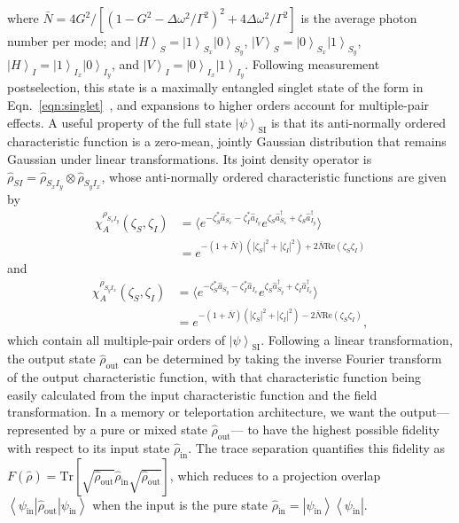 \documentclass[aps,twocolumn,secnumarabic,amsmath,amssymb,pra,groupedaddress,
showpacs, showkeys]{revtex4-1}
\newcommand{\bra}[1]{\left\langle #1 \right|}
\newcommand{\ket}[1]{\left|#1\right\rangle}
\newcommand{\pna}[1]{\left(#1\right)}
\newcommand{\pnb}[1]{\left[#1\right]}
\begin{document}
where $\bar{N}=4G^2/\pnb{\pna{1-G^2-\Delta
    \omega^2/\Gamma^2}^2+4\Delta\omega^2/\Gamma^2}$ is the average photon
number per mode; and $\ket{H}_S=\ket{1}_{S_x}\ket{0}_{S_y}$,
$\ket{V}_S=\ket{0}_{S_x}\ket{1}_{S_y}$, $\ket{H}_I=\ket{1}_{I_x}\ket{0}_{I_y}$,
and $\ket{V}_I=\ket{0}_{I_x}\ket{1}_{I_y}$. Following measurement
postselection, this state is a maximally entangled singlet state of the form in
Eqn.~\ref{eqn:singlet}~\cite{1367-2630-4-1-347}, and expansions to higher
orders account for multiple-pair effects. A useful property of the full state
$\ket{\psi}_{\textrm{SI}}$ is that its anti-normally ordered characteristic
function is a zero-mean, jointly Gaussian distribution that remains Gaussian
under linear transformations. Its joint density operator is
$\hat{\rho}_{SI}=\hat{\rho}_{S_x I_y}\otimes\hat{\rho}_{S_y I_x}$, whose
anti-normally ordered characteristic functions are given by
\begin{align} 
\chi_A^{\rho_{S_x I_y}}\pna{\zeta_S,\zeta_I} & = \langle e^{-\zeta_S^* \hat{a}_{S_x}-\zeta_I^* \hat{a}_{I_y}} e^{\zeta_S \hat{a}_{S_x}^{\dagger}+\zeta_S \hat{a}_{I_y}^{\dagger}} \rangle \nonumber \\
& = e^{-\pna{1+\bar{N}}\pna{|\zeta_S|^2+|\zeta_I|^2}+2\bar{N}\textrm{Re}\pna{\zeta_S \zeta_I}}
\end{align}
and 	
\begin{align}
\chi_A^{\rho_{S_y I_x}}\pna{\zeta_S,\zeta_I} & = \langle e^{-\zeta_S^* \hat{a}_{S_y}-\zeta_I^* \hat{a}_{I_x}} e^{\zeta_S \hat{a}_{S_y}^{\dagger}+\zeta_I \hat{a}_{I_x}^{\dagger}} \rangle \nonumber \\
& = e^{-\pna{1+\bar{N}}\pna{|\zeta_S|^2+|\zeta_I|^2}-2\bar{N}\textrm{Re}\pna{\zeta_S \zeta_I}},
\end{align}
which contain all multiple-pair orders of $\ket{\psi}_{\textrm{SI}}$. Following
a linear transformation, the output state $\hat{\rho}_{\textrm{out}}$ can be
determined by taking the inverse Fourier transform of the output characteristic
function, with that characteristic function being easily calculated from the
input characteristic function and the field transformation. In a memory or
teleportation architecture, we want the output---represented by a pure or mixed
state $\hat{\rho}_{\textrm{out}}$--- to have the highest possible fidelity with
respect to its input state $\hat{\rho}_{\textrm{in}}$. The trace separation
quantifies this fidelity as
$F\pna{\hat{\rho}}=\textrm{Tr}\pnb{\sqrt{\hat{\rho}_{\textrm{out}}}\hat{\rho}_{\textrm{in}}
  \sqrt{\hat{\rho}_{\textrm{out}}}}$, which reduces to a projection overlap
${\bra{\psi_{\textrm{in}}} \hat{\rho}_{\textrm{out}} \ket{\psi_{\textrm{in}}}}$
when the input is the pure state
$\hat{\rho}_{\textrm{in}}=\ket{\psi_{\textrm{in}}} \bra{\psi_{\textrm{in}}}$.
\end{document}
